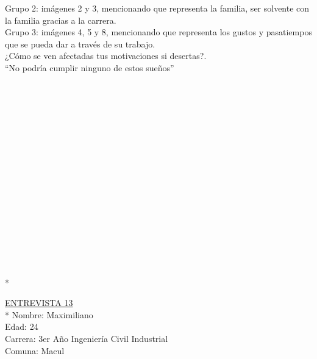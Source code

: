 Grupo 2: imágenes 2 y 3, mencionando que representa la familia, ser solvente con la familia gracias a la carrera.\\

Grupo 3: imágenes 4, 5 y 8, mencionando que representa los gustos y pasatiempos que se pueda dar a través de su trabajo.\\

¿Cómo se ven afectadas tus motivaciones si desertas?.\\

``No podría cumplir ninguno de estos sueños''\\
\\
\\
\\
\\
\\
\\
\\
\\
\\
\\
\\
\\
\\
\\
\\
\\
\\*

\underline {ENTREVISTA 13}\\*
Nombre: Maximiliano\\
Edad: 24\\
Carrera: 3er Año Ingeniería Civil Industrial\\
Comuna: Macul\\


